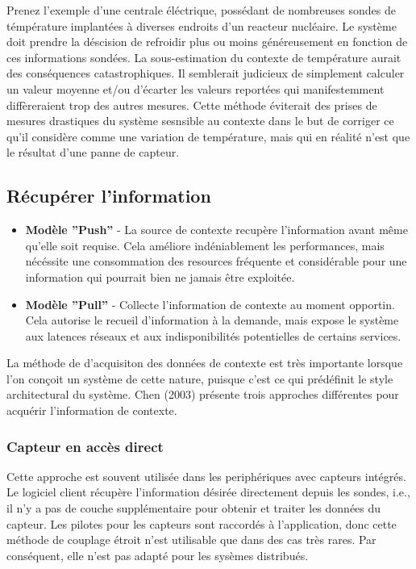 Prenez l'exemple d'une centrale éléctrique, possédant de nombreuses sondes de
témpérature implantées à diverses endroits d'un reacteur nucléaire. Le système
doit prendre la déscision de refroidir plus ou moins généreusement en fonction
de ces informations sondées. La sous-estimation du contexte de température
aurait des conséquences catastrophiques. Il semblerait judicieux de simplement
calculer un valeur moyenne et/ou d'écarter les valeurs reportées qui
manifestemment diffèreraient trop des autres mesures. Cette méthode éviterait
des prises de mesures drastiques du système sesnsible au contexte dans le but de
corriger ce qu'il considère comme une variation de température, mais qui en
réalité n'est que le résultat d'une panne de capteur.

\subsection{Récupérer l'information}

\begin{itemize}
  \item \textbf{Modèle ''Push''} - 
	  La source de contexte recupère l'information avant même qu'elle soit
	  requise. Cela améliore indéniablement les performances, mais nécéssite
	  une consommation des resources fréquente et considérable pour une
	  information qui pourrait bien ne jamais être exploitée.
  \item \textbf{Modèle ''Pull''} - 
	  Collecte l'information de contexte au moment opportin.  Cela autorise
	  le recueil d'information à la demande, mais expose le système aux
	  latences réseaux et aux indisponibilités potentielles de certains
	  services.
\end{itemize}

La méthode de d'acquisiton des données de contexte est très importante lorsque
l'on conçoit un système de cette nature, puisque c'est ce qui prédéfinit le style
architectural du système. Chen (2003) \cite{chen_intelligent_2003} présente
trois approches différentes pour acquérir l'information de contexte.

\subsubsection{Capteur en accès direct}

Cette approche est souvent utilisée dans les periphériques avec capteurs
intégrés. Le logiciel client récupère l'information désirée directement depuis
les sondes, i.e., il n'y a pas de couche supplémentaire pour obtenir et traiter
les données du capteur. Les pilotes pour les capteurs sont raccordés à
l'application, donc cette méthode de couplage étroit n'est utilisable que dans
des cas très rares. Par conséquent, elle n'est pas adapté pour les sysèmes
distribués.

